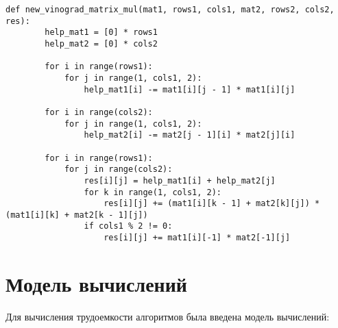 \begin{center}
	\captionsetup{justification=raggedright,singlelinecheck=off}
	\renewcommand{\lstlistingname}{Листинг}
	\begin{lstlisting}[label=lst:new_vinograd_matrix_mul, caption=Оптимизированный алгоритм Винограда]
	def new_vinograd_matrix_mul(mat1, rows1, cols1, mat2, rows2, cols2, res):
		help_mat1 = [0] * rows1
		help_mat2 = [0] * cols2
		
		for i in range(rows1):
			for j in range(1, cols1, 2):
				help_mat1[i] -= mat1[i][j - 1] * mat1[i][j]
		
		for i in range(cols2):
			for j in range(1, cols1, 2):
				help_mat2[i] -= mat2[j - 1][i] * mat2[j][i]
		
		for i in range(rows1):
			for j in range(cols2):
				res[i][j] = help_mat1[i] + help_mat2[j]
				for k in range(1, cols1, 2):
					res[i][j] += (mat1[i][k - 1] + mat2[k][j]) * (mat1[i][k] + mat2[k - 1][j])
				if cols1 % 2 != 0:
					res[i][j] += mat1[i][-1] * mat2[-1][j]
	\end{lstlisting}
\end{center}



\section{Модель вычислений}

Для вычисления трудоемкости алгоритмов была введена модель вычислений:

